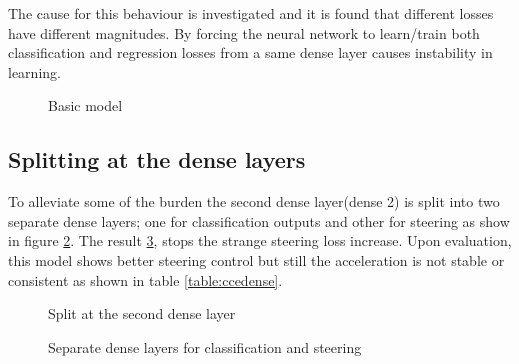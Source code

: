 The cause for this behaviour is investigated and it is found that different losses have
different magnitudes. By forcing the neural network to learn/train both classification and
regression losses from a same dense layer causes instability in learning.

\begin{figure}[t]
	\centering
    \def\svgwidth{0.8\textwidth}
    \caption{Basic model}
    \label{fig:ds3categoricalcrossentropybasic}
    \vspace*{-0.30in}
\end{figure}
\vspace{-.2in}
\subsection{Splitting at the dense layers}
To alleviate some of the burden the second dense layer(dense 2) is split into two separate dense
layers; one for classification outputs and other for steering as show in figure
\ref{fig:steeringdensesplit}. The result \ref{fig:ds3categoricalcrossentropydense}, stops
the strange steering loss increase. Upon evaluation, this model shows better steering
control but still the acceleration is not stable or consistent as shown in table
\ref{table:ccedense}.
\begin{figure}[!ht]
	\centering
    \def\svgwidth{0.5\textwidth}
    \caption{Split at the second dense layer}
    \label{fig:steeringdensesplit}
\end{figure}

\begin{figure}[!ht]
	\centering
    \def\svgwidth{0.8\textwidth}
    \caption{Separate dense layers for classification and steering}
    \label{fig:ds3categoricalcrossentropydense}
\end{figure}

